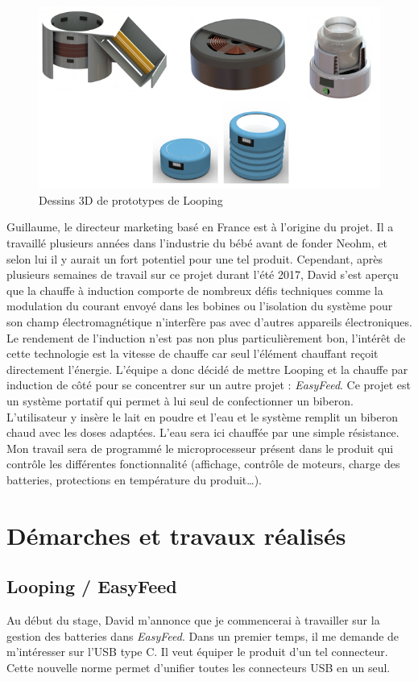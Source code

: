\documentclass[a4paper, 12pt]{report}
\begin{document}
\begin{figure}[H]
\centering
\includegraphics[scale=0.75]{figures/screenshots/3D_drawing_looping.png}
\caption{Dessins 3D de prototypes de Looping}
\label{fig:3D_looping}
\end{figure}

Guillaume, le directeur marketing basé en France est à l’origine du projet. Il a travaillé plusieurs années dans l’industrie du bébé avant de fonder Neohm, et selon lui il y aurait un fort potentiel pour une tel produit.
Cependant, après plusieurs semaines de travail sur ce projet durant l’été 2017, David s’est aperçu que la chauffe à induction comporte de nombreux défis techniques comme la modulation du courant envoyé dans les bobines ou l’isolation du système pour son champ électromagnétique n’interfère pas avec d’autres appareils électroniques. Le rendement de l’induction n’est pas non plus particulièrement bon, l’intérêt de cette technologie est la vitesse de chauffe car seul l’élément chauffant reçoit directement l’énergie.
L’équipe a donc décidé de mettre Looping et la chauffe par induction de côté pour se concentrer sur un autre projet : \emph{EasyFeed}. Ce projet est un système portatif qui permet à lui seul de confectionner un biberon. L’utilisateur y insère le lait en poudre et l’eau et le système remplit un biberon chaud avec les doses adaptées. L’eau sera ici chauffée par une simple résistance.
Mon travail sera de programmé le microprocesseur présent dans le produit qui contrôle les différentes fonctionnalité (affichage, contrôle de moteurs, charge des batteries, protections en température du produit…).

\chapter{Démarches et travaux réalisés}
\section{Looping / EasyFeed}
Au début du stage, David m’annonce que je commencerai à travailler sur la gestion des batteries dans \emph{EasyFeed}.
Dans un premier temps, il me demande de m’intéresser sur l’USB type C. Il veut équiper le produit d’un tel connecteur. Cette nouvelle norme permet d’unifier toutes les connecteurs USB en un seul.
\end{document}
